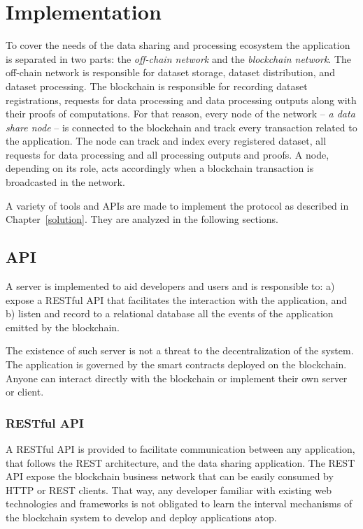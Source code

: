 \chapter{Implementation}
\label{implemenation}

To cover the needs of the data sharing and processing ecosystem the application is separated in two parts: the \textit{off-chain network} and the \textit{blockchain network}. The off-chain network is responsible for dataset storage, dataset distribution, and dataset processing. The blockchain is responsible for recording dataset registrations, requests for data processing and data processing outputs along with their proofs of computations. For that reason, every node of the network -- \textit{a data share node} -- is connected to the blockchain and track every transaction related to the application. The node can track and index every registered dataset, all requests for data processing and all processing outputs and proofs. A node, depending on its role, acts accordingly when a blockchain transaction is broadcasted in the network.

A variety of tools and APIs are made to implement the protocol as described in Chapter~\ref{solution}. They are analyzed in the following sections.

\section{API}

A server is implemented to aid developers and users and is responsible to: a) expose a RESTful API that facilitates the interaction with the application, and b) listen and record to a relational database all the events of the application emitted by the blockchain.

The existence of such server is not a threat to the decentralization of the system. The application is governed by the smart contracts deployed on the blockchain. Anyone can interact directly with the blockchain or implement their own server or client.

\subsection{RESTful API}
\label{implemenation:api:rest}

A RESTful API is provided to facilitate communication between any application, that follows the REST architecture, and the data sharing application. The REST API expose the blockchain business network that can be easily consumed by HTTP or REST clients. That way, any developer familiar with existing web technologies and frameworks is not obligated to learn the interval mechanisms of the blockchain system to develop and deploy applications atop.

